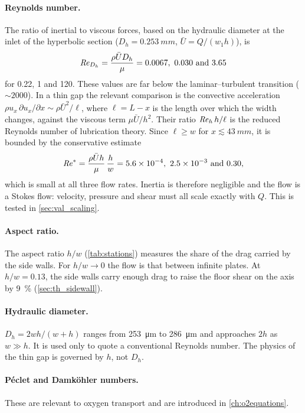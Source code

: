 \paragraph{Reynolds number.} The ratio of inertial to viscous forces, based on the hydraulic diameter at the inlet of the hyperbolic section ($D_h=\SI{0.253}{mm}$, $\bar U=Q/(w_1h)$), is
\begin{equation}
\mathit{Re}_{D_h}=\frac{\rho\bar UD_h}{\mu}=0.0067,\ 0.030\ \text{and}\ 3.65
\end{equation}
for 0.22, 1 and \SI{120}{\uLmin}. These values are far below the laminar--turbulent transition ($\sim2000$). In a thin gap the relevant comparison is the convective acceleration $\rho u_x\,\partial u_x/\partial x\sim\rho\bar U^2/\ell$, where $\ell=L-x$ is the length over which the width changes, against the viscous term $\mu\bar U/h^2$. Their ratio $\mathit{Re}_h\,h/\ell$ is the reduced Reynolds number of lubrication theory. Since $\ell\ge w$ for $x\lesssim\SI{43}{mm}$, it is bounded by the conservative estimate
\begin{equation}
\mathit{Re}^*=\frac{\rho\bar Uh}{\mu}\,\frac{h}{w}=\num{5.6e-4},\ \num{2.5e-3}\ \text{and}\ 0.30 ,
\label{eq:gov_restar}
\end{equation}
which is small at all three flow rates. Inertia is therefore negligible and the flow is a Stokes flow: velocity, pressure and shear must all scale exactly with $Q$. This is tested in \cref{sec:val_scaling}.

\paragraph{Aspect ratio.} The aspect ratio $h/w$ (\cref{tab:stations}) measures the share of the drag carried by the side walls. For $h/w\to0$ the flow is that between infinite plates. At $h/w=0.13$, the side walls carry enough drag to raise the floor shear on the axis by \SI{9}{\percent} (\cref{sec:th_sidewall}).

\paragraph{Hydraulic diameter.} $D_h=2wh/(w+h)$ ranges from \SI{253}{\micro\metre} to \SI{286}{\micro\metre} and approaches $2h$ as $w\gg h$. It is used only to quote a conventional Reynolds number. The physics of the thin gap is governed by $h$, not $D_h$.

\paragraph{P\'eclet and Damk\"ohler numbers.} These are relevant to oxygen transport and are introduced in \cref{ch:o2equations}.

